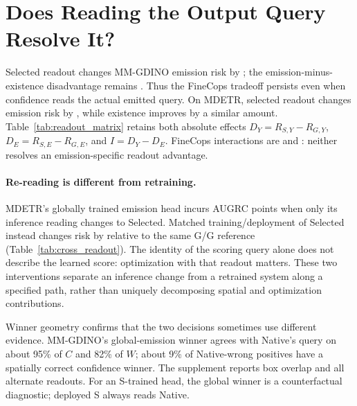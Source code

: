 \documentclass[10pt,twocolumn,letterpaper]{article}
\begin{document}
\section{Does Reading the Output Query Resolve It?}

Selected readout changes MM-GDINO emission risk by \MMReadoutChange{};
the emission-minus-existence disadvantage remains
\MMSelectedTargetRisk{}. Thus the FineCops tradeoff persists even
when confidence reads the actual emitted query. On MDETR, selected
readout changes emission risk by \MDReadoutChange{}, while existence
improves by a similar amount. Table~\ref{tab:readout_matrix} retains both
absolute effects $D_Y=R_{S,Y}-R_{G,Y}$, $D_E=R_{S,E}-R_{G,E}$, and
$I=D_Y-D_E$. FineCops interactions are \MMInteraction{} and
\MDInteraction{}: neither resolves an emission-specific readout advantage.


\paragraph{Re-reading is different from retraining.}
MDETR's globally trained emission head incurs \MDInferenceChange{}
AUGRC points when only its inference reading changes to Selected.
Matched training/deployment of Selected instead changes risk by
\MDReadoutChange{} relative to the same G/G reference
(Table~\ref{tab:cross_readout}). The identity of the scoring query alone
does not describe the learned score: optimization with that readout
matters. These two interventions separate an inference change from a
retrained system along a specified path, rather than uniquely decomposing
spatial and optimization contributions.

Winner geometry confirms that the two decisions sometimes use different
evidence. MM-GDINO's global-emission winner agrees with Native's query
on about 95\% of $C$ and 82\% of $W$; about 9\% of Native-wrong
positives have a spatially correct confidence winner. The supplement
reports box overlap and all alternate readouts. For an S-trained head,
the global winner is a counterfactual diagnostic; deployed S always
reads Native.
\end{document}
